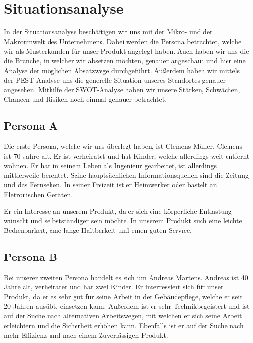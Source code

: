\newcommand{\as}{\glqq}
\newcommand{\ad}{\grqq}
\newcommand{\adl}{\grqq{ }}

\newcommand{\fref}[1]{Abb. \ref{#1}} %

\section{Situationsanalyse} \label{sitana}
    In der Situationsanalyse beschäftigen wir uns mit der Mikro- und der Makroumwelt des Unternehmens. Dabei werden die 
    Persona betrachtet, welche wir als Musterkunden für unser Produkt angelegt haben. Auch haben wir uns die die 
    Branche, in welcher wir absetzen möchten, genauer angeschaut und hier eine Analyse der möglichen Absatzwege
    durchgeführt. Außerdem haben wir mittels der PEST-Analyse uns die generelle Situation unseres Standortes genauer
    angesehen. Mithilfe der SWOT-Analyse haben wir unsere Stärken, Schwächen, Chancen und Risiken noch einmal genauer 
    betrachtet.

    \subsection{Persona A} \label{personaA}
        Die erste Persona, welche wir uns überlegt haben, ist Clemens Müller. Clemens ist 70 Jahre alt. Er ist 
        verheiratet und hat Kinder, welche allerdings weit entfernt wohnen. Er hat in seinem Leben als Ingenieur
        gearbeitet, ist allerdings mittlerweile berentet. Seine hauptsächlichen Informationsquellen sind die Zeitung
        und das Fernsehen. In seiner Freizeit ist er Heimwerker oder bastelt an Eletronischen Geräten. 

        Er ein Interesse an unserem Produkt, da er sich eine körperliche Entlastung wünscht und selbstständiger sein
        möchte. In unserem Produkt such eine leichte Bedienbarkeit, eine lange Haltbarkeit und einen guten Service.

    \subsection{Persona B} \label{personaB}
        Bei unserer zweiten Persona handelt es sich um Andreas Martens. Andreas ist 40 Jahre alt, verheiratet und hat
        zwei Kinder. Er interressiert sich für unser Produkt, da er es sehr gut für seine Arbeit in der Gebäudepflege,
        welche er seit 20 Jahren ausübt, einsetzen kann. Außerdem ist er sehr Technikbegeistert und ist auf der Suche
        nach alternativen Arbeitswegen, mit welchen er sich seine Arbeit erleichtern und die Sicherheit erhöhen kann.
        Ebenfalls ist er auf der Suche nach mehr Effizienz und nach einem Zuverlässigen Produkt.


